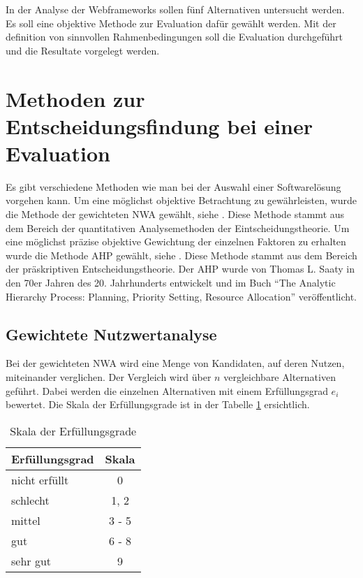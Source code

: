   In der Analyse der Webframeworks sollen fünf Alternativen untersucht werden.
  Es soll eine objektive Methode zur Evaluation dafür gewählt werden. Mit der
  definition von sinnvollen Rahmenbedingungen soll die Evaluation durchgeführt
  und die Resultate vorgelegt werden.
  
  \section{Methoden zur Entscheidungsfindung bei einer Evaluation}
  
  Es gibt verschiedene Methoden wie man bei der Auswahl einer Softwarelösung
  vorgehen kann. Um eine möglichst objektive Betrachtung zu gewährleisten, wurde
  die Methode der gewichteten \ac{NWA} gewählt, siehe \cite{Nutzwertanalyse}.
  Diese Methode stammt aus dem Bereich der quantitativen Analysemethoden der
  Eintscheidungstheorie. Um eine möglichst präzise objektive Gewichtung der
  einzelnen Faktoren zu erhalten wurde die Methode \ac{AHP} gewählt, siehe
  \cite{AnalyticHierarchyProcess}. Diese Methode stammt aus dem Bereich der
  präskriptiven Entscheidungstheorie. Der \ac{AHP} wurde von Thomas L. Saaty in
  den 70er Jahren des 20. Jahrhunderts entwickelt und im Buch ``The Analytic
  Hierarchy Process: Planning, Priority Setting, Resource
  Allocation''\cite{AnalyticHierarchyProcessBook} veröffentlicht.
  
  \subsection{Gewichtete Nutzwertanalyse}
  
  Bei der gewichteten \ac{NWA} wird eine Menge von Kandidaten, auf deren
  Nutzen, miteinander verglichen. Der Vergleich wird über \(n\) vergleichbare
  Alternativen geführt. Dabei werden die einzelnen Alternativen mit einem
  Erfüllungsgrad \(e_i\) bewertet. Die Skala der Erfüllungsgrade ist in der
  Tabelle \ref{tab:erfuellungsgrade} ersichtlich.
  \newline
  
  \begin{table}[ht]
    \begin{center}
      \begin{tabular}{lc}
        \toprule
        Erfüllungsgrad & Skala\\
        \midrule
        nicht erfüllt & 0\\
        schlecht & 1, 2\\
        mittel & 3 - 5\\
        gut & 6 - 8\\
        sehr gut & 9\\
        \bottomrule
      \end{tabular}
      \caption{Skala der Erfüllungsgrade}
      \label{tab:erfuellungsgrade}
    \end{center}
  \end{table}
  
